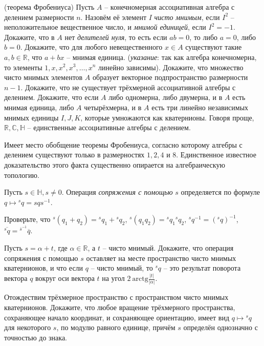 \documentclass[a4paper, 12pt]{article}
\begin{document}


 (теорема Фробениуса)
	Пусть $A$ -- конечномерная ассоциативная алгебра с делением размерности $n$. Назовём её элемент $I$ \emph{чисто мнимым}, если $I^2$ -- неположительное вещественное число, и \emph{мнимой единицей}, если $I^2 = -1$.  Докажите, что в $A$ нет \emph{делителей нуля}, то есть если $ab =0$, то либо $a=0$, либо $b=0$.  Докажите, что для любого невещественного $x \in A$ существуют такие $a,b \in \mathbb{R}$, что $a + bx$ -- мнимая единица. (\emph{указание}: так как алгебра конечномерна, то элементы $1,x,x^2,x^3,\ldots,x^n$ линейно зависимы).  Докажите, что множество чисто мнимых элементов $A$ образует векторное подпространство размерности $n-1$.  Докажите, что не существует трёхмерной ассоциативной алгебры с делением.  Докажите, что если $A$ либо одномерна, либо двумерна, и в $A$ есть мнимая единица, либо $A$ четырёхмерна, и в $A$ есть три линейно независимых мнимых единицы $I,J,K$, которые умножаются как кватернионы. Говоря проще, $\mathbb{R}, \mathbb{C}, \mathbb{H}$ -- единственные ассоциативные алгебры с делением.

{\small Имеет место обобщение теоремы Фробениуса, согласно которому алгебры с делением существуют только в размерностях $1,2,4$ и $8$. Единственное известное доказательство этого факта существенно опирается на алгебраическую топологию.}

	Пусть $s \in \mathbb{H}, s \neq 0$. Операция \emph{сопряжения с помощью} $s$ определяется по формуле $q \mapsto {}^sq = sqs^{-1}$.

	Проверьте, что ${}^s(q_1 + q_2) = {}^sq_1+{}^sq_2$, ${}^s(q_1q_2) = {}^sq_1 {}^sq_2$, ${}^sq^{-1} = ({}^sq)^{-1}$, $\overline{{}^sq} = {}^{\overline{s}^{-1}}\overline{q}$.

	Пусть $s = \alpha + t$, где $\alpha \in \mathbb{R}$, а $t$ -- чисто мнимый. Докажите, что операция сопряжения с помощью $s$ оставляет на месте пространство чисто мнимых кватернионов, и что если $q$ -- чисто мнимый, то ${}^sq$ -- это результат поворота вектора $q$ вокруг оси вектора $t$ на угол $2 \ \mathrm{arctg} \frac{|t|}{|\alpha|}$.

	Отождествим трёхмерное пространство с пространством чисто мнимых кватернионов. Докажите, что любое вращение трёхмерного пространства, сохраняющее начало координат, и сохраняющее ориентацию, имеет вид $q \mapsto {}^sq$ для некоторого $s$, по модулю равного единице, причём $s$ определён однозначно с точностью до знака.
\end{document}
